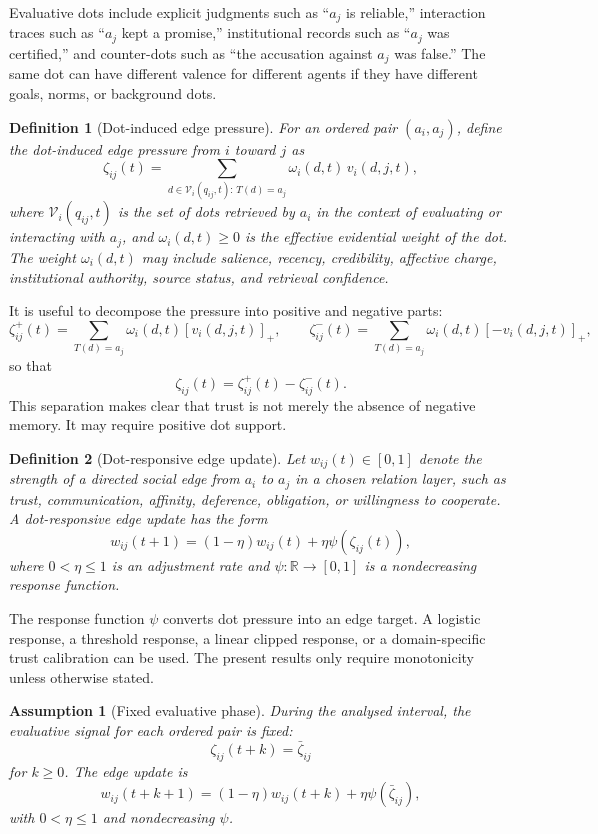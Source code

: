 \documentclass[11pt]{article}
\newtheorem{definition}{Definition}
\newtheorem{assumption}{Assumption}
\theoremstyle{remark}
\begin{document}
Evaluative dots include explicit judgments such as ``$a_j$ is reliable,''
interaction traces such as ``$a_j$ kept a promise,'' institutional records
such as ``$a_j$ was certified,'' and counter-dots such as ``the accusation
against $a_j$ was false.'' The same dot can have different valence for
different agents if they have different goals, norms, or background dots.

\begin{definition}[Dot-induced edge pressure]\label{def:edge-pressure}
For an ordered pair $(a_i,a_j)$, define the dot-induced edge pressure
from $i$ toward $j$ as
$$
\zeta_{ij}(t)=
\sum_{d\in \mathcal V_i(q_{ij},t):\,T(d)=a_j}
\omega_i(d,t)\,v_i(d,j,t),
$$
where $\mathcal V_i(q_{ij},t)$ is the set of dots retrieved by $a_i$ in the
context of evaluating or interacting with $a_j$, and
$\omega_i(d,t)\geq0$ is the effective evidential weight of the dot. The
weight $\omega_i(d,t)$ may include salience, recency, credibility,
affective charge, institutional authority, source status, and retrieval
confidence.
\end{definition}

It is useful to decompose the pressure into positive and negative parts:
$$
\zeta_{ij}^{+}(t)=\sum_{T(d)=a_j}\omega_i(d,t)[v_i(d,j,t)]_+,
\qquad
\zeta_{ij}^{-}(t)=\sum_{T(d)=a_j}\omega_i(d,t)[-v_i(d,j,t)]_+,
$$
so that
$$
\zeta_{ij}(t)=\zeta_{ij}^{+}(t)-\zeta_{ij}^{-}(t).
$$
This separation makes clear that trust is not merely the absence of
negative memory. It may require positive dot support.

\begin{definition}[Dot-responsive edge update]\label{def:dot-responsive-edge-update}
Let $w_{ij}(t)\in[0,1]$ denote the strength of a directed social edge
from $a_i$ to $a_j$ in a chosen relation layer, such as trust,
communication, affinity, deference, obligation, or willingness to
cooperate. A dot-responsive edge update has the form
$$
w_{ij}(t+1)=(1-\eta)w_{ij}(t)+\eta\psi(\zeta_{ij}(t)),
$$
where $0<\eta\leq1$ is an adjustment rate and
$\psi:\mathbb R\rightarrow[0,1]$ is a nondecreasing response function.
\end{definition}

The response function $\psi$ converts dot pressure into an edge target.
A logistic response, a threshold response, a linear clipped response, or
a domain-specific trust calibration can be used. The present results
only require monotonicity unless otherwise stated.

\begin{assumption}[Fixed evaluative phase]\label{ass:fixed-evaluative-phase}
During the analysed interval, the evaluative signal for each ordered
pair is fixed:
$$
\zeta_{ij}(t+k)=\bar{\zeta}_{ij}
$$
for $k\geq0$. The edge update is
$$
w_{ij}(t+k+1)=(1-\eta)w_{ij}(t+k)+\eta\psi(\bar{\zeta}_{ij}),
$$
with $0<\eta\leq1$ and nondecreasing $\psi$.
\end{assumption}
\end{document}
